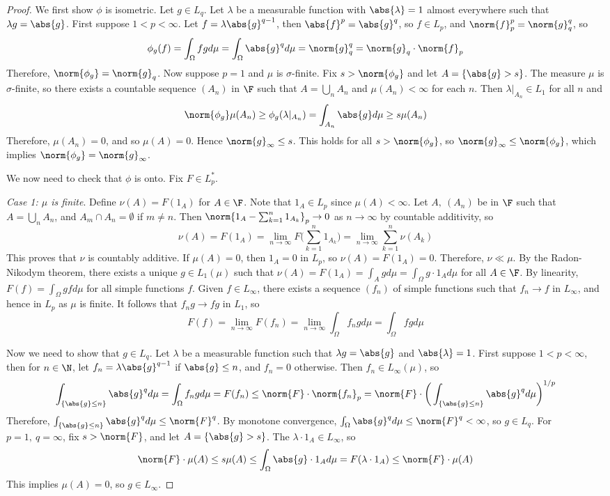\documentclass[a4paper]{article}
\begin{document}
\begin{proof}
	We first show $\phi$ is isometric. Let $g\in L_q$. Let $\lambda$ be a measurable function with $\abs{\lambda}=1$ almost everywhere such that $\lambda g=\abs{g}$. First suppose $1<p<\infty$. Let $f=\lambda\abs{g}^{q-1}$, then $\abs{f}^p=\abs{g}^q$, so $f\in L_p$, and $\norm{f}_p^p=\norm{g}_q^q$, so
	\[
	 \phi_g(f)=\int_\Omega fg d\mu=\int_\Omega\abs{g}^q d\mu=\norm{g}_q^q=\norm{g}_q\cdot\norm{f}_p
	\]
	Therefore, $\norm{\phi_g}=\norm{g}_q$. Now suppose $p=1$ and $\mu$ is $\sigma$-finite. Fix $s>\norm{\phi_g}$ and let $A=\{\abs{g}>s\}$. The measure $\mu$ is $\sigma$-finite, so there exists a countable sequence $(A_n)$ in $\F$ such that $A=\bigcup_n A_n$ and $\mu(A_n)<\infty$ for each $n$. Then $\lambda|_{A_n}\in L_1$ for all $n$ and
	\[
	 \norm{\phi_g}\mu(A_n)\geq\phi_g(\lambda|_{A_n})=\int_{A_n}\abs{g}d\mu\geq s\mu(A_n)
	\]
	Therefore, $\mu(A_n)=0$, and so $\mu(A)=0$. Hence $\norm{g}_\infty\leq s$. This holds for all $s>\norm{\phi_g}$, so $\norm{g}_\infty\leq\norm{\phi_g}$, which implies $\norm{\phi_g}=\norm{g}_\infty$.

	We now need to check that $\phi$ is onto. Fix $F\in L_p^*$.

	\emph{Case 1: $\mu$ is finite}. Define $\nu(A)=F(1_A)$ for $A\in\F$. Note that $1_A\in L_p$ since $\mu(A)<\infty$. Let $A,\ (A_n)$ be in $\F$ such that $A=\bigcup_n A_n$, and $A_m\cap A_n=\emptyset$ if $m\not= n$. Then $\norm{1_A-\sum_{k=1}^n 1_{A_k}}_p\to 0$ as $n\to\infty$ by countable additivity, so
	\[
	 \nu(A)=F(1_A)=\lim_{n\to\infty}F\Big(\sum_{k=1}^n 1_{A_k}\Big)=\lim_{n\to\infty}\sum_{k=1}^n\nu(A_k)
	\]
	This proves that $\nu$ is countably additive. If $\mu(A)=0$, then $1_A=0$ in $L_p$, so $\nu(A)=F(1_A)=0$. Therefore, $\nu\ll\mu$. By the Radon-Nikodym theorem, there exists a unique $g\in L_1(\mu)$ such that $\nu(A)=F(1_A)=\int_A g d\mu=\int_\Omega g\cdot 1_A d\mu$ for all $A\in\F$. By linearity, $F(f)=\int_\Omega gf d\mu$ for all simple functions $f$. Given $f\in L_\infty$, there exists a sequence $(f_n)$ of simple functions such that $f_n\to f$ in $L_\infty$, and hence in $L_p$ as $\mu$ is finite. It follows that $f_ng\to fg$ in $L_1$, so
	\[
	 F(f)=\lim_{n\to\infty} F(f_n)=\lim_{n\to\infty}\int_\Omega f_n g d\mu=\int_\Omega fgd\mu
	\]

	Now we need to show that $g\in L_q$. Let $\lambda$ be a measurable function such that $\lambda g=\abs{g}$ and $\abs{\lambda}=1$. First suppose $1<p<\infty$, then for $n\in\N$, let $f_n=\lambda\abs{g}^{q-1}$ if $\abs{g}\leq n$, and $f_n=0$ otherwise. Then $f_n\in L_\infty(\mu)$, so
	\[
	 \int_{\{\abs{g}\leq n\}}\abs{g}^q d\mu=\int_\Omega f_n gd\mu=F(f_n)\leq\norm{F}\cdot\norm{f_n}_p=\norm{F}\cdot\bigg(\int_{\{ \abs{g}\leq n\}}\abs{g}^q d\mu\bigg)^{1/p}
	\]
	Therefore, $\int_{\{\abs{g}\leq n\}}\abs{g}^qd\mu\leq\norm{F}^q$. By monotone convergence, $\int_\Omega\abs{g}^qd\mu\leq\norm{F}^q<\infty$, so $g\in L_q$. For $p=1,\ q=\infty$, fix $s>\norm{F}$, and let $A=\{\abs{g}>s\}$. The $\lambda\cdot 1_A\in L_\infty$, so
	\[
	 \norm{F}\cdot\mu(A)\leq s\mu(A)\leq\int_\Omega\abs{g}\cdot 1_Ad\mu=F(\lambda\cdot 1_A)\leq\norm{F}\cdot\mu(A)
	\]
	This implies $\mu(A)=0$, so $g\in L_\infty$.


\end{proof}
\end{document}
